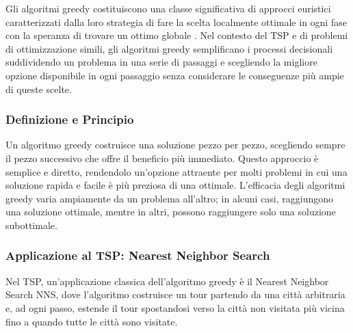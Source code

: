 Gli algoritmi greedy costituiscono una classe significativa di approcci euristici caratterizzati dalla loro strategia di fare la scelta localmente ottimale in ogni fase con la speranza di trovare un ottimo globale \cite{Cormen2009}. Nel contesto del \Gls{TSP} e di problemi di ottimizzazione simili, gli algoritmi greedy semplificano i processi decisionali suddividendo un problema in una serie di passaggi e scegliendo la migliore opzione disponibile in ogni passaggio senza considerare le conseguenze più ampie di queste scelte\cite{Johnson2002}.

\subsubsection{Definizione e Principio}

Un algoritmo greedy costruisce una soluzione pezzo per pezzo, scegliendo sempre il pezzo successivo che offre il beneficio più immediato\cite{Papadimitriou1998}. Questo approccio è semplice e diretto, rendendolo un'opzione attraente per molti problemi in cui una soluzione rapida e facile è più preziosa di una ottimale. L'efficacia degli algoritmi greedy varia ampiamente da un problema all'altro; in alcuni casi, raggiungono una soluzione ottimale, mentre in altri, possono raggiungere solo una soluzione subottimale\cite{Lawler1985}.

\subsubsection{Applicazione al \Gls{TSP}: Nearest Neighbor Search}

Nel \Gls{TSP}, un'applicazione classica dell'algoritmo greedy è il Nearest Neighbor Search \Gls{NNS}, dove l'algoritmo costruisce un tour partendo da una città arbitraria e, ad ogni passo, estende il tour spostandosi verso la città non visitata più vicina fino a quando tutte le città sono visitate\cite{Gutin2016}.


